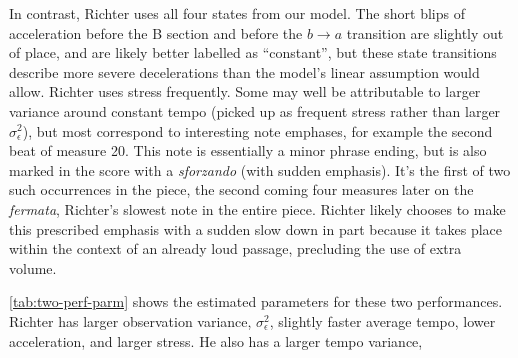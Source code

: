 \documentclass[12pt]{article}
\begin{document}
In contrast, Richter uses all four states from our model. The short
blips of acceleration before the B section and before the
$b \rightarrow a$ transition are slightly out of place, and are
likely better labelled as ``constant'', but these state transitions
describe more severe decelerations than the model's linear
assumption would allow. Richter uses stress frequently. Some may well be
attributable to larger variance around constant tempo (picked up as
frequent stress rather than larger $\sigma^2_\epsilon$), but most
correspond to interesting note emphases, for example the second beat
of measure 20. This note is essentially a minor phrase ending, but is
also marked in the score with a {\em sforzando} (with sudden
emphasis). It's the first of two such occurrences in the piece, the
second coming four measures later on the {\em fermata}, Richter's slowest
note in the entire piece. Richter likely chooses to make this
prescribed emphasis with a sudden slow down in part because it takes
place within the context of an already loud passage, precluding the
use of extra volume.
\begin{table}[tb]
  \centering
  \caption{The estimated parameters for performances by Richter and
    Hatto.}
\label{tab:two-perf-parm}
\end{table}
\autoref{tab:two-perf-parm} shows the estimated parameters for these
two performances. Richter has larger observation variance,
$\sigma^2_{\epsilon}$, slightly faster average tempo, lower
acceleration, and larger stress. He also has a larger tempo variance,
\end{document}
